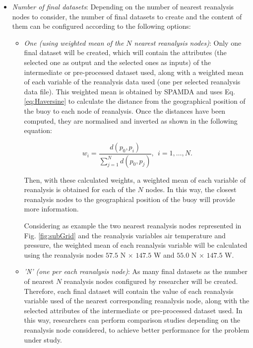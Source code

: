 \documentclass[energies,article,submit,moreauthors,pdftex]{Definitions/mdpi}
\begin{document}
\begin{itemize}
					\item \textit{Number of final datasets}: Depending on the number of nearest reanalysis nodes to consider, the number of final datasets to create and the content of them can be configured according to the following options:
						\begin{itemize}
						
							\item \textit{One (using weighted mean of the $N$ nearest reanalysis nodes)}: Only one final dataset will be created, which will contain the attributes (the selected one as output and the selected ones as inputs) of the intermediate or pre-processed dataset used, along with a weighted mean of each variable of the reanalysis data used (one per selected reanalysis data file). This weighted mean is obtained by SPAMDA and uses Eq. \ref{eq:Haversine} to calculate the distance from the geographical position of the buoy to each node of reanalysis. Once the distances have been computed, they are normalised and inverted as shown in the following equation:
								\begin{linenomath*}
									\begin{equation}
										w_i=\frac{d(p_0,p_i)}{\sum_{j=1}^{N} d(p_0,p_j)}, ~~i=1, \ldots, N.
										\label{eq:weightedMean}
									\end{equation}
								\end{linenomath*}

							Then, with these calculated weights, a weighted mean of each variable of reanalysis is obtained for each of the $N$ nodes. In this way, the closest reanalysis nodes to the geographical position of the buoy will provide more information.
							
							Considering as example the two nearest reanalysis nodes represented in Fig. \ref{fig:subGrid} and the reanalysis variables air temperature and pressure, the weighted mean of each reanalysis variable will be calculated using the reanalysis nodes $57.5$ N $\times$ $147.5$ W and $55.0$ N $\times$ $147.5$ W.
							
							\item \textit{'N' (one per each reanalysis node)}: As many final datasets as the number of nearest $N$ reanalysis nodes configured by researcher will be created. Therefore, each final dataset will contain the value of each reanalysis variable used of the nearest corresponding reanalysis node, along with the selected attributes of the intermediate or pre-processed dataset used. In this way, researchers can perform comparison studies depending on the reanalysis node considered, to achieve better performance for the problem under study.
							

\end{itemize}
\end{itemize}
\end{document}
